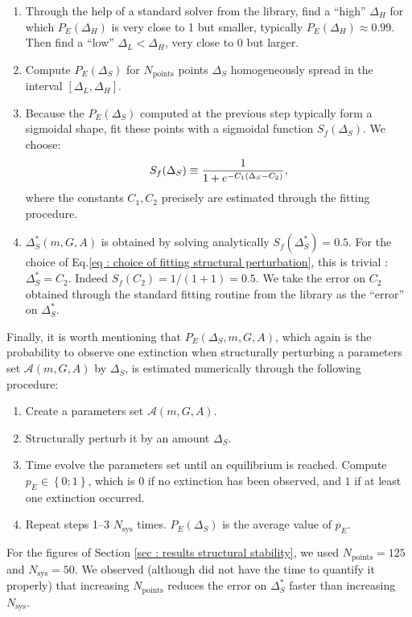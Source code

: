 \documentclass[12pt, titlepage]{report}
\begin{document}
\begin{enumerate}
\item Through the help of a standard solver from the  library, find a ``high'' $\Delta_H$ for which $P_E(\Delta_H)$ is very close to 1 but smaller, typically $P_E(\Delta_H) \approx 0.99$. Then find a ``low'' $\Delta_L < \Delta_H$, very close to $0$ but larger.
\item Compute $P_E(\Delta_S)$ for $N_{\text{points}}$ points $\Delta_S$ homogeneously spread in the interval $[\Delta_L, \Delta_H]$.
\item Because the $P_E(\Delta_S)$ computed at the previous step typically form a sigmoidal shape, fit these points with a sigmoidal function $S_f(\Delta_S)$. We choose:
\begin{equation}
S_f(\Delta_S) \equiv \frac{1}{1+e^{-C_1(\Delta_S-C_2)}}, \label{eq : choice of fitting structural perturbation}
\end{equation}
where the constants $C_1, C_2$ precisely are estimated through the fitting procedure.
\item $\Delta_S^*(m, G, A)$ is obtained by solving analytically $S_f(\Delta_S^*)=0.5$. For the choice of Eq.\eqref{eq : choice of fitting structural perturbation}, this is trivial : $\Delta_S^* = C_2$. Indeed $S_f(C_2)=1/(1+1)=0.5$. We take the error on $C_2$ obtained through the standard fitting routine from the  library as the ``error'' on $\Delta_S^*$.
\end{enumerate}
Finally, it is worth mentioning that $P_E(\Delta_S, m, G, A)$, which again is the probability to observe  one extinction when structurally perturbing a parameters set $\mathcal{A}(m,G,A)$ by $\Delta_S$, is estimated numerically through the following procedure:
\begin{enumerate}
\item Create a parameters set $\mathcal{A}(m, G, A)$.
\item Structurally perturb it by an amount $\Delta_S$.
\item Time evolve the parameters set until an equilibrium is reached. Compute $p_E \in \left\{0;1\right\}$, which is $0$ if no extinction has been observed, and $1$ if at least one extinction occurred.
\item Repeat steps 1--3 $N_{\text{sys}}$ times. $P_E(\Delta_S)$ is the average value of $p_E$.
\end{enumerate}
For the figures of Section \ref{sec : results structural stability}, we used $N_\text{points}=125$ and $N_\text{sys}=50$. We observed (although did not have the time to quantify it properly) that increasing $N_\text{points}$ reduces the error on $\Delta_S^*$ faster than increasing $N_\text{sys}$.
\end{document}
